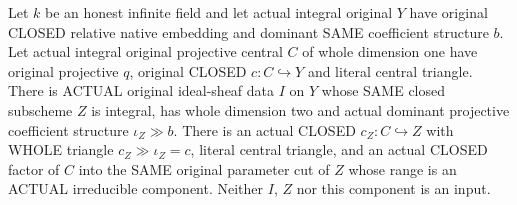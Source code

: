 \begin{theorem}
\label{thm:pl-gauss-original-closed-horizontal-surface-through-curve}
\leanok
Let $k$ be an honest infinite field and let actual integral original
$Y$ have original CLOSED relative native embedding and dominant SAME
coefficient structure $b$. Let actual integral original projective
central $C$ of whole dimension one have original projective $q$,
original CLOSED $c:C\hookrightarrow Y$ and literal central triangle.
There is ACTUAL original ideal-sheaf data $I$ on $Y$ whose SAME closed
subscheme $Z$ is integral, has whole dimension two and actual dominant
projective coefficient structure $\iota_Z\gg b$. There is an actual
CLOSED $c_Z:C\hookrightarrow Z$ with WHOLE triangle
$c_Z\gg\iota_Z=c$, literal central triangle, and an actual CLOSED
factor of $C$ into the SAME original parameter cut of $Z$ whose range
is an ACTUAL irreducible component. Neither $I$, $Z$ nor this component
is an input.
\end{theorem}

